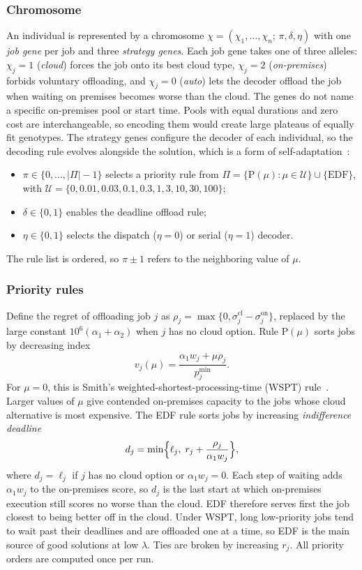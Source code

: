 \documentclass[conference]{IEEEtran}
\begin{document}
\subsubsection{Chromosome}
An individual is represented by a chromosome $\chi=(\chi_1,\ldots,\chi_n;\,\pi,\delta,\eta)$ with one \emph{job gene} per job and three \emph{strategy genes}. Each job gene takes one of three alleles: $\chi_j=1$ (\emph{cloud}) forces the job onto its best cloud type, $\chi_j=2$ (\emph{on-premises}) forbids voluntary offloading, and $\chi_j=0$ (\emph{auto}) lets the decoder offload the job when waiting on premises becomes worse than the cloud. The genes do not name a specific on-premises pool or start time. Pools with equal durations and zero cost are interchangeable, so encoding them would create large plateaus of equally fit genotypes. The strategy genes configure the decoder of each individual, so the decoding rule evolves alongside the solution, which is a form of self-adaptation~\cite{Eiben1999}:
\begin{itemize}
 \item $\pi\in\{0,\ldots,|\Pi|-1\}$ selects a priority rule from $\Pi=\{\mathrm{P}(\mu):\mu\in\mathcal{U}\}\cup\{\mathrm{EDF}\}$, with $\mathcal{U}=\{0,0.01,0.03,0.1,0.3,1,3,10,30,100\}$;
 \item $\delta\in\{0,1\}$ enables the deadline offload rule;
 \item $\eta\in\{0,1\}$ selects the dispatch ($\eta=0$) or serial ($\eta=1$) decoder.
\end{itemize}
The rule list is ordered, so $\pi\pm1$ refers to the neighboring value of $\mu$.

\subsubsection{Priority rules}
Define the regret of offloading job $j$ as $\rho_j=\max\{0,\sigma_j^{\mathrm{cl}}-\sigma_j^{\mathrm{on}}\}$, replaced by the large constant $10^6(\alpha_1+\alpha_2)$ when $j$ has no cloud option. Rule $\mathrm{P}(\mu)$ sorts jobs by decreasing index
\begin{equation}
 v_j(\mu)=\frac{\alpha_1w_j+\mu\rho_j}{p_j^{\min}}.
\end{equation}
For $\mu=0$, this is Smith's weighted-shortest-processing-time (WSPT) rule~\cite{Smith1956}. Larger values of $\mu$ give contended on-premises capacity to the jobs whose cloud alternative is most expensive. The EDF rule sorts jobs by increasing \emph{indifference deadline}
\begin{equation}
 d_j=\min\Bigl\{\ell_j,\;r_j+\frac{\rho_j}{\alpha_1w_j}\Bigr\},
 \label{eq:deadline}
\end{equation}
where $d_j=\ell_j$ if $j$ has no cloud option or $\alpha_1w_j=0$. Each step of waiting adds $\alpha_1w_j$ to the on-premises score, so $d_j$ is the last start at which on-premises execution still scores no worse than the cloud. EDF therefore serves first the job closest to being better off in the cloud. Under WSPT, long low-priority jobs tend to wait past their deadlines and are offloaded one at a time, so EDF is the main source of good solutions at low $\lambda$. Ties are broken by increasing $r_j$. All priority orders are computed once per run.
\end{document}

